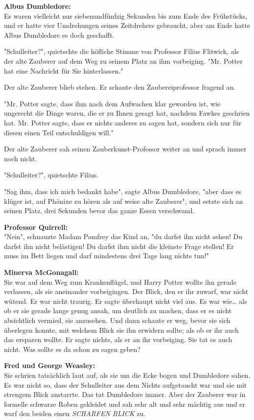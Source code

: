 {\textbf{Albus Dumbledore:}\\ Es waren vielleicht nur siebenundfünfzig Sekunden bis zum Ende des Frühstücks, und er hatte vier Umdrehungen seines Zeitdrehers gebraucht, aber am Ende hatte Albus Dumbledore es doch geschafft.

"Schulleiter?", quietschte die höfliche Stimme von Professor Filius Flitwick, als der alte Zauberer auf dem Weg zu seinem Platz an ihm vorbeiging. "Mr. Potter hat eine Nachricht für Sie hinterlassen."

Der alte Zauberer blieb stehen. Er schaute den Zaubereiprofessor fragend an.

"Mr. Potter sagte, dass ihm nach dem Aufwachen klar geworden ist, wie ungerecht die Dinge waren, die er zu Ihnen gesagt hat, nachdem Fawkes geschrien hat. Mr. Potter sagte, dass er nichts anderes zu sagen hat, sondern sich nur für diesen einen Teil entschuldigen will."

Der alte Zauberer sah seinen Zauberkunst-Professor weiter an und sprach immer noch nicht.

"Schulleiter?", quietschte Filius.

"Sag ihm, dass ich mich bedankt habe", sagte Albus Dumbledore, "aber dass es klüger ist, auf Phönixe zu hören als auf weise alte Zauberer", und setzte sich an seinen Platz, drei Sekunden bevor das ganze Essen verschwand.

\textbf{Professor Quirrell:}\\ "Nein", schnauzte Madam Pomfrey das Kind an, "du darfst ihn nicht sehen! Du darfst ihn nicht belästigen! Du darfst ihm nicht die kleinste Frage stellen! Er muss im Bett liegen und darf mindestens drei Tage lang nichts tun!"

\textbf{Minerva McGonagall:}\\ Sie war auf dem Weg zum Krankenflügel, und Harry Potter wollte ihn gerade verlassen, als sie aneinander vorbeigingen. Der Blick, den er ihr zuwarf, war nicht wütend. Er war nicht traurig. Er sagte überhaupt nicht viel aus. Es war wie… als ob er sie gerade lange genug ansah, um deutlich zu machen, dass er es nicht absichtlich vermied, sie anzusehen. Und dann schaute er weg, bevor sie sich überlegen konnte, mit welchem Blick sie ihn erwidern sollte; als ob er ihr auch das ersparen wollte. Er sagte nichts, als er an ihr vorbeiging. Sie tat es auch nicht. Was sollte es da schon zu sagen geben?

\textbf{Fred und George Weasley:}\\ Sie schrien tatsächlich laut auf, als sie um die Ecke bogen und Dumbledore sahen. Es war nicht so, dass der Schulleiter aus dem Nichts aufgetaucht war und sie mit strengem Blick anstarrte. Das tat Dumbledore immer. Aber der Zauberer war in formelle schwarze Roben gekleidet und sah sehr alt und sehr mächtig aus und er warf den beiden einen \emph{SCHARFEN BLICK} zu.

}
